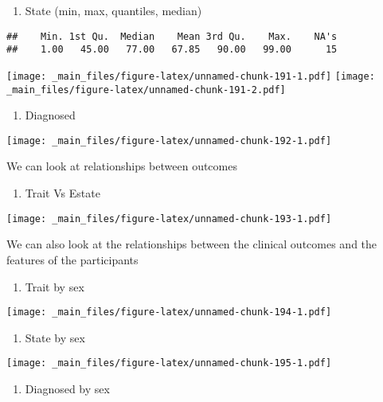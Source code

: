 \documentclass[
]{book}
\providecommand{\tightlist}{%
  \setlength{\itemsep}{0pt}\setlength{\parskip}{0pt}}
\begin{document}
\begin{enumerate}
\def\labelenumi{\alph{enumi}.}
\setcounter{enumi}{1}
\tightlist
\item
  State (min, max, quantiles, median)
\end{enumerate}

\begin{verbatim}
##    Min. 1st Qu.  Median    Mean 3rd Qu.    Max.    NA's 
##    1.00   45.00   77.00   67.85   90.00   99.00      15
\end{verbatim}

\texttt{[image: \_main\_files/figure-latex/unnamed-chunk-191-1.pdf]} \texttt{[image: \_main\_files/figure-latex/unnamed-chunk-191-2.pdf]}

\begin{enumerate}
\def\labelenumi{\alph{enumi}.}
\setcounter{enumi}{2}
\tightlist
\item
  Diagnosed
\end{enumerate}

\texttt{[image: \_main\_files/figure-latex/unnamed-chunk-192-1.pdf]}

We can look at relationships between outcomes

\begin{enumerate}
\def\labelenumi{\alph{enumi}.}
\setcounter{enumi}{3}
\tightlist
\item
  Trait Vs Estate
\end{enumerate}

\texttt{[image: \_main\_files/figure-latex/unnamed-chunk-193-1.pdf]}

We can also look at the relationships between the clinical outcomes and the features of the participants

\begin{enumerate}
\def\labelenumi{\alph{enumi}.}
\setcounter{enumi}{4}
\tightlist
\item
  Trait by sex
\end{enumerate}

\texttt{[image: \_main\_files/figure-latex/unnamed-chunk-194-1.pdf]}

\begin{enumerate}
\def\labelenumi{\alph{enumi}.}
\setcounter{enumi}{5}
\tightlist
\item
  State by sex
\end{enumerate}

\texttt{[image: \_main\_files/figure-latex/unnamed-chunk-195-1.pdf]}

\begin{enumerate}
\def\labelenumi{\alph{enumi}.}
\setcounter{enumi}{6}
\tightlist
\item
  Diagnosed by sex
\end{enumerate}
\end{document}
